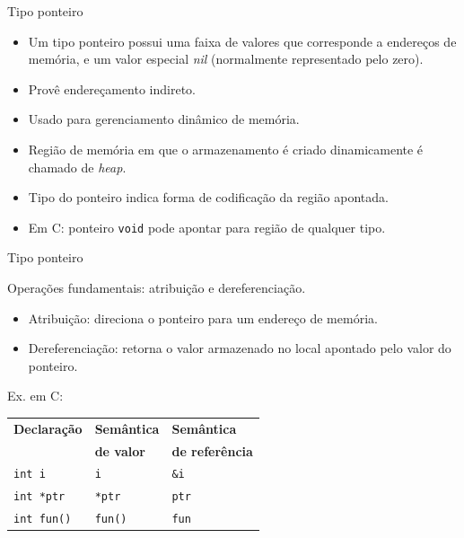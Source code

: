 \documentclass[handout]{beamer}
\begin{document}
\begin{frame}[fragile]{Tipo ponteiro}
    \begin{itemize}
        \item Um tipo ponteiro possui uma faixa de valores que corresponde a endereços de memória, e um valor especial \textit{nil} (normalmente representado pelo zero).
        \item Provê endereçamento indireto.
        \item Usado para gerenciamento dinâmico de memória.
        \item Região de memória em que o armazenamento é criado dinamicamente é chamado de \textit{heap}.
        \item Tipo do ponteiro indica forma de codificação da região apontada.
        \item Em C: ponteiro \lstinline|void| pode apontar para região de qualquer tipo.
    \end{itemize}
\end{frame}

\begin{frame}[fragile]{Tipo ponteiro}
    \begin{itemize}
        \item Operações fundamentais: atribuição e dereferenciação.
        \begin{itemize}
            \item Atribuição: direciona o ponteiro para um endereço de memória.
            \item Dereferenciação: retorna o valor armazenado no local apontado pelo valor do ponteiro.
        \end{itemize}
        \begin{center}
            \item Ex. em C:

            \begin{tabular}{lll}
                \hline
                \textbf{Declaração} & \textbf{Semântica} & \textbf{Semântica} \\
                & \textbf{de valor} & \textbf{de referência} \\ \hline
                \lstinline|int i| & \lstinline|i| & \lstinline|&i| \\
                \lstinline|int *ptr| & \lstinline|*ptr| & \lstinline|ptr| \\
                \lstinline|int fun()| & \lstinline|fun()| & \lstinline|fun| \\
                \hline
            \end{tabular}
        \end{center}

    \end{itemize}


\end{frame}
\end{document}
